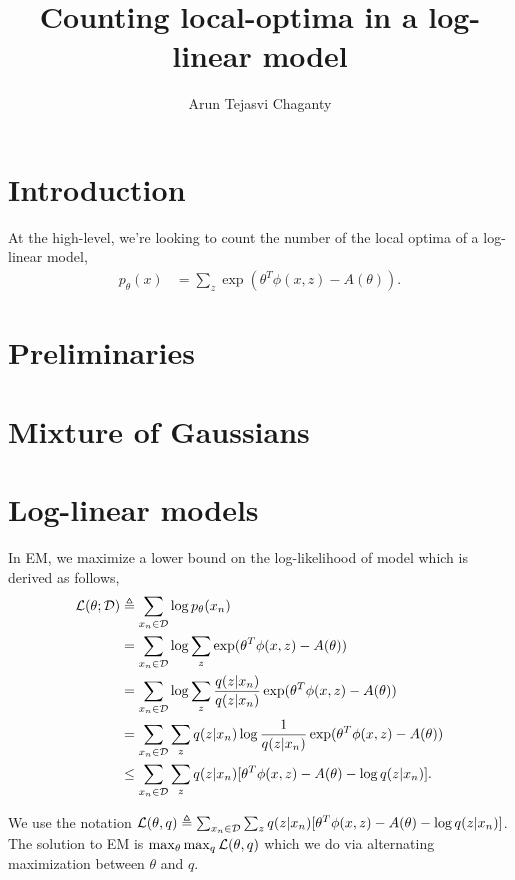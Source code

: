 \documentclass[tablecaption=bottom]{jmlr}
\title{Counting local-optima in a log-linear model}
\author{Arun Tejasvi Chaganty \Email{chaganty@cs.stanford.edu}}
\begin{document}
\maketitle

\section{Introduction}

At the high-level, we're looking to count the number of the local optima
of a log-linear model,
\begin{align}
p_{\theta}(x) &= \sum_z \exp(\theta^T \phi(x,z) - A(\theta)).
\end{align}


\section{Preliminaries}

\section{Mixture of Gaussians}

\section{Log-linear models}

In EM, we maximize a lower bound on the log-likelihood of model which is
derived as follows,
\begin{align}
  \mathcal{L}(\theta ; \mathcal{D}) 
    &\triangleq \sum_{x_n \in \mathcal{D}} \log p_{\theta}(x_n) \\
    &= \sum_{x_n \in \mathcal{D}} \log \sum_z \exp(\theta^T \phi(x,z) - A(\theta)) \\
    &= \sum_{x_n \in \mathcal{D}} \log \sum_z \frac{q(z|x_n)}{q(z|x_n)} \exp(\theta^T \phi(x,z) - A(\theta)) \\
    &= \sum_{x_n \in \mathcal{D}} \sum_z q(z|x_n) \log \frac{1}{q(z|x_n)} \exp(\theta^T \phi(x,z) - A(\theta)) \\
    &\le \sum_{x_n \in \mathcal{D}} \sum_z q(z|x_n) [\theta^T \phi(x,z) - A(\theta) - \log q(z|x_n)].
\end{align}

We use the notation $\mathcal{L}(\theta, q) \triangleq \sum_{x_n \in \mathcal{D}} \sum_z
q(z|x_n) [\theta^T \phi(x,z) - A(\theta) - \log q(z|x_n)]$. The solution
to EM is $\max_\theta \max_q \mathcal{L}(\theta,q)$ which we do via alternating
maximization between $\theta$ and $q$.
\end{document}
